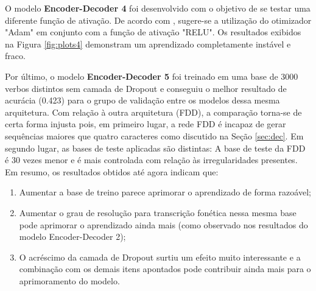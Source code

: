 O modelo \textbf{Encoder-Decoder 4} foi desenvolvido com o objetivo de se testar uma diferente função de ativação. De acordo com %
, sugere-se a utilização do otimizador "Adam" em conjunto com a função de ativação "RELU". Os resultados exibidos na Figura \ref{fig:plots4} demonstram um aprendizado completamente instável e fraco. 

Por último, o modelo \textbf{Encoder-Decoder 5} foi treinado em uma base de 3000 verbos distintos sem camada de Dropout e conseguiu o melhor resultado de acurácia (0.423) para o grupo de validação entre os modelos dessa mesma arquitetura. Com relação à outra arquitetura (FDD), a comparação torna-se de certa forma injusta pois, em primeiro lugar, a rede FDD é incapaz de gerar sequências maiores que quatro caracteres como discutido na Seção \ref{sec:dec}. Em segundo lugar, as bases de teste aplicadas são distintas: A base de teste da FDD é 30 vezes menor e é mais controlada com relação às irregularidades presentes.\\

Em resumo, os resultados obtidos até agora indicam que: 

\begin{enumerate}
\item Aumentar a base de treino parece aprimorar o aprendizado de forma razoável;
\item Aumentar o grau de resolução para transcrição fonética nessa mesma base pode aprimorar o aprendizado ainda mais (como observado nos resultados do modelo Encoder-Decoder 2);
\item O acréscimo da camada de Dropout surtiu um efeito muito interessante e a combinação com os demais itens apontados pode contribuir ainda mais para o aprimoramento do modelo.
\end{enumerate}

